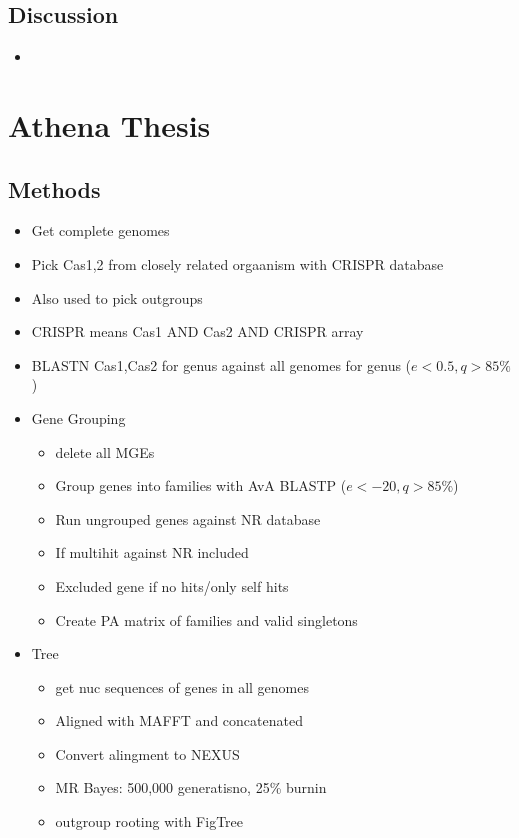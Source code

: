 \documentclass[10pt,letter]{article}
\begin{document}
\subsection*{Discussion}
\begin{itemize}
    \item
\end{itemize}
\printbibliography
\section*{Athena Thesis}
\subsection*{Methods}
\begin{itemize}
    \item Get complete genomes
    \item Pick Cas1,2 from closely related orgaanism with CRISPR database
    \item Also used to pick outgroups
    \item CRISPR means Cas1 AND Cas2 AND CRISPR array
    \item BLASTN Cas1,Cas2 for genus against all genomes for genus ($e<0.5, q >85\%$)
    \item Gene Grouping
    \begin{itemize}
        \item delete all MGEs
        \item Group genes into families with AvA BLASTP ($e<-20, q>85\%$)
        \item Run ungrouped genes against NR database
        \item If multihit against NR included
        \item Excluded gene if no hits/only self hits
        \item Create PA matrix of families and valid singletons
    \end{itemize}
    \item Tree
    \begin{itemize}
        \item get nuc sequences of genes in all genomes
        \item Aligned with MAFFT and concatenated
        \item Convert alingment to NEXUS
        \item MR Bayes: 500,000 generatisno, 25\% burnin
        \item outgroup rooting with FigTree
    \end{itemize}

\end{itemize}
\end{document}
